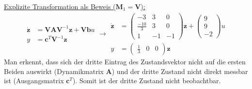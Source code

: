 \documentclass[crop=false]{standalone}
\begin{document}
\begin{task}
\begin{enumerate}[i]
\begin{solution}
 \underline{Explizite Transformation als Beweis ($\mathbf{M}_1 = \mathbf{V}$):}
 \[ \begin{aligned}\dot{\mathbf{z}} &= \mathbf{V}\mathbf{A}\mathbf{V}^{-1}\mathbf{z}+\mathbf{V}\mathbf{b}u\\
 y &= \mathbf{c}^T \mathbf{V}^{-1}\mathbf{z}
 \end{aligned} \rightarrow
 \begin{aligned}\dot{\mathbf{z}} &= 
 \begin{pmatrix}
 -3 & 3 & 0\\
 \frac{-10}{3} & 3 & 0\\
 1 & -1 & -1
 \end{pmatrix}
 \mathbf{z}+
 \begin{pmatrix}
 9\\9\\-2
 \end{pmatrix}
 u\\
 y &= \begin{pmatrix}
 \frac{1}{3}&0&0
 \end{pmatrix}\mathbf{z}
 \end{aligned}
 \]
 Man erkennt, dass sich der dritte Eintrag des Zustandsvektor nicht auf die ersten Beiden auswirkt (Dynamikmatrix $\mathbf{A}$) und der dritte Zustand nicht direkt messbar ist (Ausgangsmatrix $\mathbf{c}^T$). Somit ist der dritte Zustand nicht beobachtbar.
 \end{solution}
 \end{enumerate}
\end{task}
\end{document}
